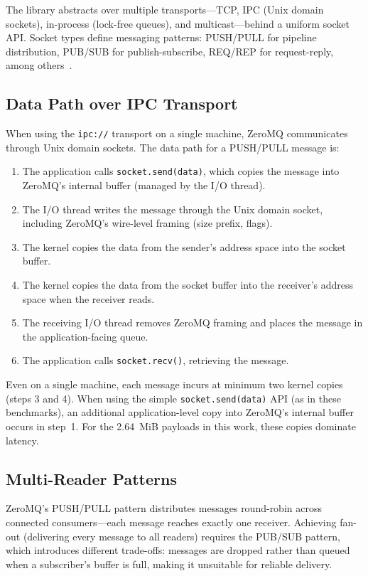 The library abstracts over multiple transports---TCP, IPC (Unix domain sockets), in-process (lock-free queues), and multicast---behind a uniform socket API. Socket types define messaging patterns: PUSH/PULL for pipeline distribution, PUB/SUB for publish-subscribe, REQ/REP for request-reply, among others~\cite{zeromq_guide}.

\subsection{Data Path over IPC Transport}

When using the \texttt{ipc://} transport on a single machine, ZeroMQ communicates through Unix domain sockets. The data path for a PUSH/PULL message is:

\begin{enumerate}
    \item The application calls \texttt{socket.send(data)}, which copies the message into ZeroMQ's internal buffer (managed by the I/O thread).
    \item The I/O thread writes the message through the Unix domain socket, including ZeroMQ's wire-level framing (size prefix, flags).
    \item The kernel copies the data from the sender's address space into the socket buffer.
    \item The kernel copies the data from the socket buffer into the receiver's address space when the receiver reads.
    \item The receiving I/O thread removes ZeroMQ framing and places the message in the application-facing queue.
    \item The application calls \texttt{socket.recv()}, retrieving the message.
\end{enumerate}

Even on a single machine, each message incurs at minimum two kernel copies (steps 3 and 4). When using the simple \texttt{socket.send(data)} API (as in these benchmarks), an additional application-level copy into ZeroMQ's internal buffer occurs in step~1. For the 2.64~MiB payloads in this work, these copies dominate latency.

\subsection{Multi-Reader Patterns}

ZeroMQ's PUSH/PULL pattern distributes messages round-robin across connected consumers---each message reaches exactly one receiver. Achieving fan-out (delivering every message to all readers) requires the PUB/SUB pattern, which introduces different trade-offs: messages are dropped rather than queued when a subscriber's buffer is full, making it unsuitable for reliable delivery.


